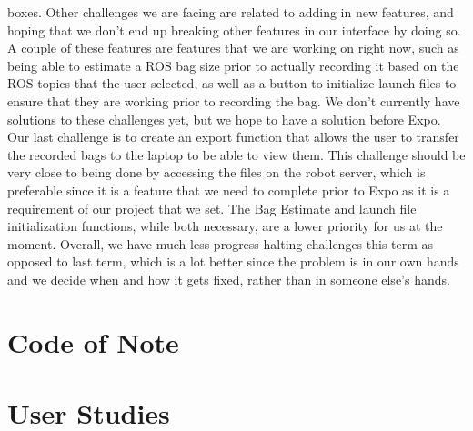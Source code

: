 \documentclass[onecolumn, draftclsnofoot,10pt, compsoc]{IEEEtran}
\begin{document}
boxes. Other challenges we are facing are related to adding in new features, and hoping that we don't end up breaking other features in our interface by doing so. A couple of these features are features that we are working on right now, such as being able to estimate a ROS bag size prior to actually recording it based on the ROS topics that the user selected, as well as a button to initialize launch files to ensure that they are working prior to recording the bag. We don't currently have solutions to these challenges yet, but we hope to have a solution before Expo. Our last challenge is to create an export function that allows the user to transfer the recorded bags to the laptop to be able to view them. This challenge should be very close to being done by accessing the files on the robot server, which is preferable since it is a feature that we need to complete prior to Expo as it is a requirement of our project that we set. The Bag Estimate and launch file initialization functions, while both necessary, are a lower priority for us at the moment. Overall, we have much less progress-halting challenges this term as opposed to last term, which is a lot better since the problem is in our own hands and we decide when and how it gets fixed, rather than in someone else's hands.

\section{Code of Note}

\section{User Studies}



\end{document}
